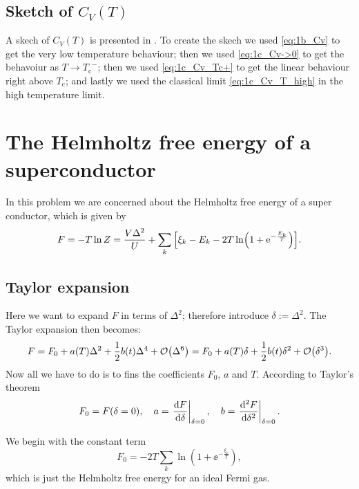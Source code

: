\documentclass[11pt,letter, swedish, english
]{article}
\newcommand{\Tc}{\ensuremath{T_{\text{c}}}}
\begin{document}
\subsection{Sketch of $C_V(T)$}
A skech of $C_V(T)$ is presented in . To create the
skech we used \eqref{eq:1b_Cv} to get the very low temperature
behaviour; then we used \eqref{eq:1c_Cv->0} to get the behavoiur as
$T\to\Tc^-$; then we used \eqref{eq:1c_Cv_Tc+} to get the linear
behaviour right above $\Tc$; and lastly we used the classical limit
\eqref{eq:1c_Cv_T_high} in the high temperature limit.


\begin{figure}
\centering
\resizebox{.7\textwidth}{!}{}
\caption{}
\label{fig:1_Cv}
\end{figure}








\section{The Helmholtz free energy of a superconductor}
\newcommand{\xD}{x_{\text{D}}}
In this problem we are concerned about the Helmholtz free energy of a
super conductor, which is given by
\begin{equation}\label{eq:2_F}
F=-T\ln{Z}=\frac{V\Delta^2}{U} + 
\sum_k\qty[\xi_k-E_k-2T\ln(1+\mathrm{e}^{-\frac{E_k}{T}})].
\end{equation}

\subsection{Taylor expansion}
Here we want to expand $F$ in terms of $\Delta^2$; therefore introduce
$\delta:=\Delta^2$. The Taylor expansion then becomes:
\begin{equation}
F=F_0+a(T)\Delta^2 + \frac{1}{2}b(t)\Delta^4+\order{\Delta^6}
=F_0+a(T)\delta + \frac{1}{2}b(t)\delta^2+\order{\delta^3}.
\end{equation}
Now all we have to do is to fins the coefficients $F_0$, $a$ and $T$. 
According to Taylor's theorem 
\begin{equation}
F_0=F(\delta=0)\qcomma
a=\eval{\dv{F}{\delta}}_{\delta=0}\qcomma
b=\eval{\dv[2]{F}{\delta}}_{\delta=0}.
\end{equation}

We begin with the constant term
\begin{equation}
F_0=-2T\sum_k\ln(1+\ee^{-\frac{\xi_k}{T}}),
\end{equation}
which is just the Helmholtz free energy for an ideal Fermi gas.
\end{document}
